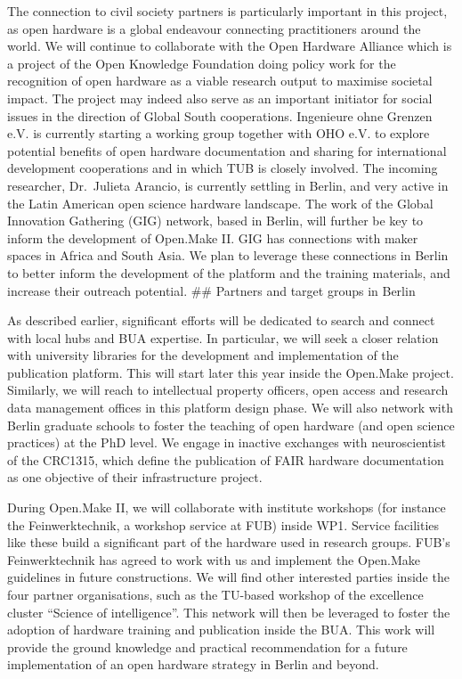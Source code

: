 \documentclass[
  12pt,
  a4paper,
]{article}
\begin{document}
The connection to civil society partners is particularly important in
this project, as open hardware is a global endeavour connecting
practitioners around the world. We will continue to collaborate with the
Open Hardware Alliance which is a project of the Open Knowledge
Foundation doing policy work for the recognition of open hardware as a
viable research output to maximise societal impact. The project may
indeed also serve as an important initiator for social issues in the
direction of Global South cooperations. Ingenieure ohne Grenzen e.V. is
currently starting a working group together with OHO e.V. to explore
potential benefits of open hardware documentation and sharing for
international development cooperations and in which TUB is closely
involved. The incoming researcher, Dr.~Julieta Arancio, is currently
settling in Berlin, and very active in the Latin American open science
hardware landscape. The work of the Global Innovation Gathering (GIG)
network, based in Berlin, will further be key to inform the development
of Open.Make II. GIG has connections with maker spaces in Africa and
South Asia. We plan to leverage these connections in Berlin to better
inform the development of the platform and the training materials, and
increase their outreach potential. \#\# Partners and target groups in
Berlin

As described earlier, significant efforts will be dedicated to search
and connect with local hubs and BUA expertise. In particular, we will
seek a closer relation with university libraries for the development and
implementation of the publication platform. This will start later this
year inside the Open.Make project. Similarly, we will reach to
intellectual property officers, open access and research data management
offices in this platform design phase. We will also network with Berlin
graduate schools to foster the teaching of open hardware (and open
science practices) at the PhD level. We engage in inactive exchanges
with neuroscientist of the CRC1315, which define the publication of FAIR
hardware documentation as one objective of their infrastructure project.

During Open.Make II, we will collaborate with institute workshops (for
instance the Feinwerktechnik, a workshop service at FUB) inside WP1.
Service facilities like these build a significant part of the hardware
used in research groups. FUB's Feinwerktechnik has agreed to work with
us and implement the Open.Make guidelines in future constructions. We
will find other interested parties inside the four partner
organisations, such as the TU-based workshop of the excellence cluster
``Science of intelligence''. This network will then be leveraged to
foster the adoption of hardware training and publication inside the BUA.
This work will provide the ground knowledge and practical recommendation
for a future implementation of an open hardware strategy in Berlin and
beyond.
\end{document}
